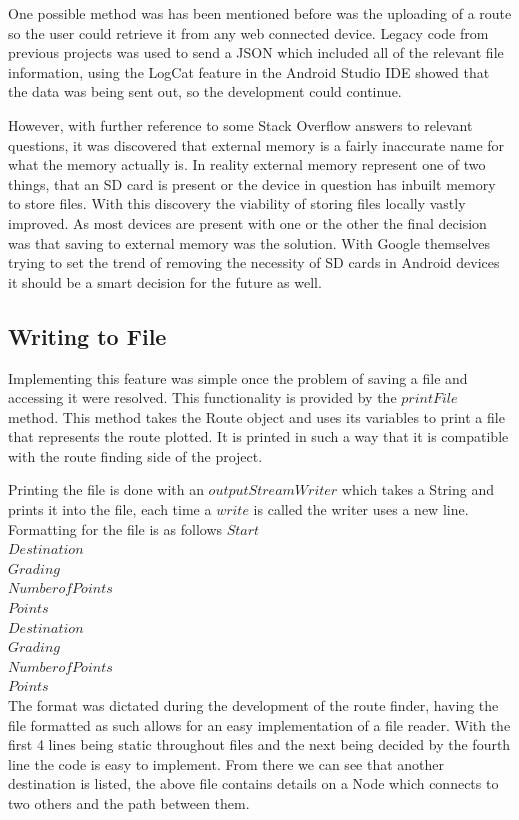 One possible method was has been mentioned before was the uploading of a route so the user could retrieve it from any web connected device. Legacy code from previous projects was used to send a JSON which included all of the relevant file information, using the LogCat feature in the Android Studio IDE\cite{as} showed that the data was being sent out, so the development could continue.

However, with further reference to some Stack Overflow answers to relevant questions\cite{check}, it was discovered that external memory is a fairly inaccurate name for what the memory actually is. In reality external memory represent one of two things, that an SD card is present or the device in question has inbuilt memory to store files\cite{storage}. With this discovery the viability of storing files locally vastly improved. As most devices are present with one or the other the final decision was that saving to external memory was the solution. With Google themselves trying to set the trend of removing the necessity of SD cards in Android devices it should be a smart decision for the future as well. 

\subsection{Writing to File}
Implementing this feature was simple once the problem of saving a file and accessing it were resolved. This functionality is provided by the $printFile$ method. This method takes the Route object and uses its variables to print a file that represents the route plotted. It is printed in such a way that it is compatible with the route finding side of the project. 

Printing the file is done with an $outputStreamWriter$ which takes a String and prints it into the file, each time a $write$ is called the writer uses a new line. Formatting for the file is as follows
$Start$\\
$Destination$\\
$Grading$\\
$Number of Points$\\
$Points$\\
$Destination$\\
$Grading$\\
$Number of Points$\\
$Points$\\
The format was dictated during the development of the route finder, having the file formatted as such allows for an easy implementation of a file reader. With the first 4 lines being static throughout files and the next being decided by the fourth line the code is easy to implement. From there we can see that another destination is listed, the above file contains details on a Node which connects to two others and the path between them. 

